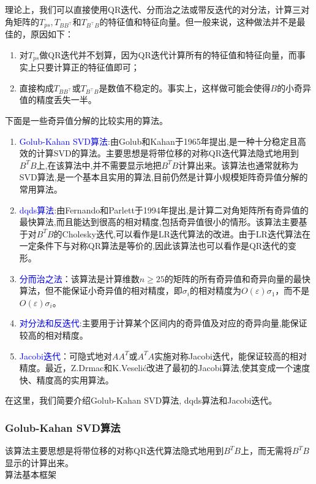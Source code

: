 \documentclass[12pt,a4paper]{article}
\begin{document}
理论上，我们可以直接使用QR迭代、分而治之法或带反迭代的对分法，计算三对角矩阵的$T_{p s}, T_{B B^{\top}}$和$T_{B^{\top} B}$的特征值和特征向量。但一般来说，这种做法并不是最佳的，原因如下：
\begin{enumerate}[(1)]
	\item 对$T_{p s}$做QR迭代并不划算，因为QR迭代计算所有的特征值和特征向量，而事实上只要计算正的特征值即可；
	\item 直接构成$T_{B B^{\top}}$或$T_{B^{\top} B}$是数值不稳定的。事实上，这样做可能会使得$B$的小奇异值的精度丢失一半。
\end{enumerate}

下面是一些奇异值分解的比较实用的算法。
\begin{enumerate}[1.]
	\item \textcolor{blue}{Golub-Kahan SVD算法}:由Golub和Kahan于1965年提出,是一种十分稳定且高效的计算SVD的算法。主要思想是将带位移的对称QR迭代算法隐式地用到$B^TB$上,在该算法中,并不需要显示地把$B^TB$计算出来。该算法也通常就称为SVD算法,是一个基本且实用的算法,目前仍然是计算小规模矩阵奇异值分解的常用算法。
	\item \textcolor{blue}{dqds算法}:由Fernando和Parlett于1994年提出,是计算二对角矩阵所有奇异值的最快算法,而且能达到很高的相对精度,包括奇异值很小的情形。该算法主要基于对$B^TB$的Cholesky迭代,可以看作是LR迭代算法的改进。由于LR迭代算法在一定条件下与对称QR算法是等价的,因此该算法也可以看作是QR迭代的变形。
	\item \textcolor{blue}{分而治之法}：该算法是计算维数$n \geq 25$的矩阵的所有奇异值和奇异向量的最快算法，但不能保证小奇异值的相对精度，即$\sigma_{i}$的相对精度为$O(\varepsilon) \sigma_{1}$，而不是$O(\varepsilon) \sigma_{i}$。
	\item \textcolor{blue}{对分法和反迭代}:主要用于计算某个区间内的奇异值及对应的奇异向量,能保证较高的相对精度。
	\item \textcolor{blue}{Jacobi迭代}：可隐式地对$AA^T$或$A^TA$实施对称Jacobi迭代，能保证较高的相对精度。最近，Z.Drmac和K.Veselić改进了最初的Jacobi算法,使其变成一个速度快、精度高的实用算法。
\end{enumerate}

在这里，我们简要介绍Golub-Kahan SVD算法, dqds算法和Jacobi迭代。
\subsubsection{Golub-Kahan SVD算法}
该算法主要思想是将带位移的对称QR迭代算法隐式地用到$B^TB$上，而无需将$B^TB$显示的计算出来。\\
算法基本框架
\end{document}
